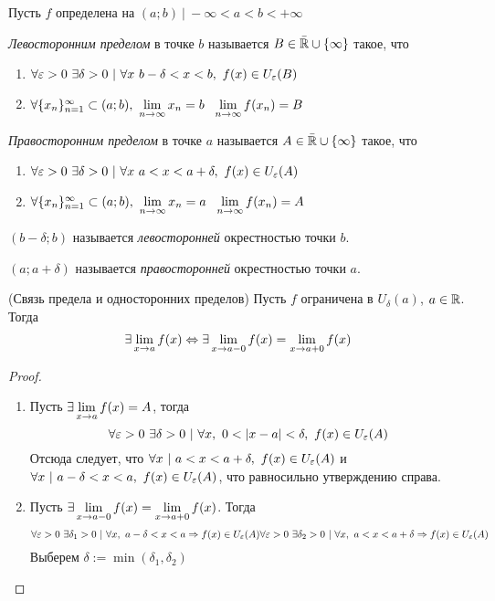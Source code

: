 \begin{definition}
	Пусть $f$ определена на $(a; b)\ |\ -\infty < a < b < +\infty$
	
	\textit{Левосторонним пределом} в точке $b$ называется $B \in \bar{\mathbb{R}} \cup \{\infty\}$ такое, что
	\begin{enumerate}
		\item $\forall \varepsilon > 0\ \exists \delta > 0\ |\ \forall x\ b - \delta < x < b,\ f(x) \in U_{\varepsilon}(B)$
		
		\item $\forall \{x_n\}_{n = 1}^\infty \subset (a; b),\ \lim\limits_{n \to \infty} x_n = b\ \ \lim\limits_{n \to \infty} f(x_n) = B$
	\end{enumerate}

	\textit{Правосторонним пределом} в точке $a$ называется $A \in \bar{\mathbb{R}} \cup \{\infty\}$ такое, что
	\begin{enumerate}
		\item $\forall \varepsilon > 0\ \exists \delta > 0\ |\ \forall x\ a < x < a + \delta,\ f(x) \in U_{\varepsilon}(A)$
		
		\item $\forall \{x_n\}_{n = 1}^\infty \subset (a; b),\ \lim\limits_{n \to \infty} x_n = a\ \ \lim\limits_{n \to \infty} f(x_n) = A$
	\end{enumerate}
\end{definition}

\begin{definition}
	$(b - \delta; b)$ называется \textit{левосторонней} окрестностью точки $b$.
	
	$(a; a + \delta)$ называется \textit{правосторонней} окрестностью точки $a$.
\end{definition}

\begin{theorem} (Связь предела и односторонних пределов)
	Пусть $f$ ограничена в $U_{\delta}(a)$, $a \in \mathbb{R}$. Тогда
	$$
		\exists \lim\limits_{x \to a} f(x) \Leftrightarrow \exists \lim\limits_{x \to a-0} f(x) = \lim\limits_{x \to a+0} f(x)
	$$
\end{theorem}

\begin{proof}
\begin{enumerate}
	\item Пусть $\exists \lim\limits_{x \to a} f(x) = A$, тогда
	$$
		\forall \eps > 0\ \exists \delta > 0\ |\ \forall x,\ 0 < |x - a| < \delta,\ f(x) \in U_{\eps}(A)
	$$
	Отсюда следует, что $\forall x\ |\ a < x < a + \delta,\ f(x) \in U_{\varepsilon}(A)$ и $\forall x\ |\ a - \delta < x < a,\ f(x) \in U_{\varepsilon}(A)$, что равносильно утверждению справа.
	
	\item Пусть $\exists \lim\limits_{x \to a-0} f(x) = \lim\limits_{x \to a+0} f(x)$. Тогда
	$$
		\forall \eps > 0\ \exists \delta_1 > 0\ |\ \forall x,\ a - \delta < x < a \Ra f(x) \in U_{\eps}(A)
		\forall \eps > 0\ \exists \delta_2 > 0\ |\ \forall x,\ a < x < a + \delta \Ra f(x) \in U_{\eps}(A)
	$$
	Выберем $\delta := \min(\delta_1, \delta_2)$
\end{enumerate}

\end{proof}


